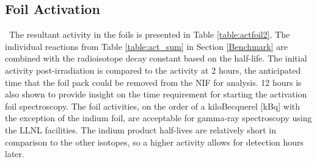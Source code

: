 \subsection{Foil Activation}

\ The resultant activity in the foils is presented in Table \ref{table:actfoil2}. 
The individual reactions from Table \ref{table:act_sum} in Section \ref{Benchmark} are combined with the radioisotope decay constant based on the half-life. 
The initial activity post-irradiation is compared to the activity at 2 hours, the anticipated time that the foil pack could be removed from the NIF for analysis. 12 hours is also shown to provide insight on the time requirement for starting the activation foil spectroscopy. 
The foil activities, on the order of a kiloBecquerel [kBq] with the exception of the indium foil, are acceptable for gamma-ray spectroscopy using the LLNL facilities. 
The indium product half-lives are relatively short in comparison to the other isotopes, so a higher activity allows for detection hours later. 

